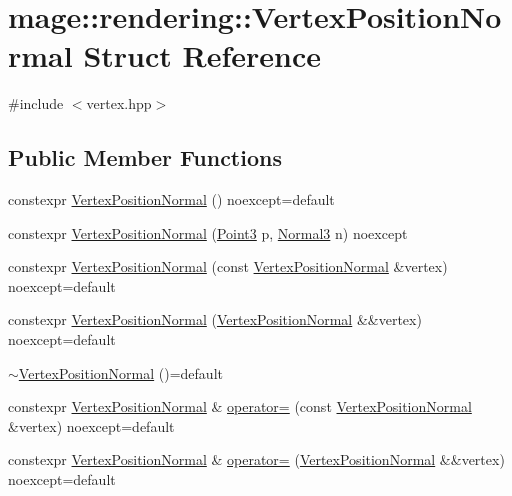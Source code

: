 \hypertarget{structmage_1_1rendering_1_1_vertex_position_normal}{}\section{mage\+:\+:rendering\+:\+:Vertex\+Position\+Normal Struct Reference}
\label{structmage_1_1rendering_1_1_vertex_position_normal}


{\ttfamily \#include $<$vertex.\+hpp$>$}

\subsection*{Public Member Functions}
\begin{DoxyCompactItemize}
\item 
constexpr \mbox{\hyperlink{structmage_1_1rendering_1_1_vertex_position_normal_afa00dc1c7ed3f8c09dc68ee6e7d1c43f}{Vertex\+Position\+Normal}} () noexcept=default
\item 
constexpr \mbox{\hyperlink{structmage_1_1rendering_1_1_vertex_position_normal_a587edfdfb7feecc7b9d9dfea6c2fe632}{Vertex\+Position\+Normal}} (\mbox{\hyperlink{structmage_1_1_point3}{Point3}} p, \mbox{\hyperlink{structmage_1_1_normal3}{Normal3}} n) noexcept
\item 
constexpr \mbox{\hyperlink{structmage_1_1rendering_1_1_vertex_position_normal_a055a98c2d6f827b94fed59bbed300c9e}{Vertex\+Position\+Normal}} (const \mbox{\hyperlink{structmage_1_1rendering_1_1_vertex_position_normal}{Vertex\+Position\+Normal}} \&vertex) noexcept=default
\item 
constexpr \mbox{\hyperlink{structmage_1_1rendering_1_1_vertex_position_normal_a7d090031c9fce5c0e997d92083bb40d0}{Vertex\+Position\+Normal}} (\mbox{\hyperlink{structmage_1_1rendering_1_1_vertex_position_normal}{Vertex\+Position\+Normal}} \&\&vertex) noexcept=default
\item 
\mbox{\hyperlink{structmage_1_1rendering_1_1_vertex_position_normal_ac5abfb1132d54581b006cd098f533811}{$\sim$\+Vertex\+Position\+Normal}} ()=default
\item 
constexpr \mbox{\hyperlink{structmage_1_1rendering_1_1_vertex_position_normal}{Vertex\+Position\+Normal}} \& \mbox{\hyperlink{structmage_1_1rendering_1_1_vertex_position_normal_ae6eb4c994e2b84cef3c874255633c7a1}{operator=}} (const \mbox{\hyperlink{structmage_1_1rendering_1_1_vertex_position_normal}{Vertex\+Position\+Normal}} \&vertex) noexcept=default
\item 
constexpr \mbox{\hyperlink{structmage_1_1rendering_1_1_vertex_position_normal}{Vertex\+Position\+Normal}} \& \mbox{\hyperlink{structmage_1_1rendering_1_1_vertex_position_normal_ab91c35523dc03eb777f572853b4be633}{operator=}} (\mbox{\hyperlink{structmage_1_1rendering_1_1_vertex_position_normal}{Vertex\+Position\+Normal}} \&\&vertex) noexcept=default
\end{DoxyCompactItemize}
